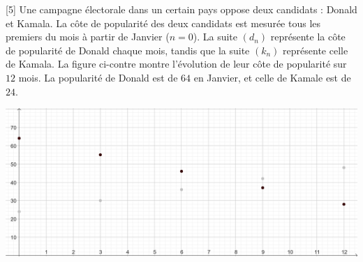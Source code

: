 \documentclass{exam}
\begin{document}
\begin{questions}
\vspace*{1cm}

[5]
Une campagne électorale dans un certain pays oppose deux candidats : Donald et Kamala. La côte de popularité des deux candidats est mesurée tous les premiers du mois à partir de Janvier ($n = 0$). La suite $(d_n)$ représente la côte de popularité de Donald chaque mois, tandis que la suite $(k_n)$ représente celle de Kamala. La figure ci-contre montre l'évolution de leur côte de popularité sur $12$ mois. La popularité de Donald est de $64$ en Janvier, et celle de Kamale est de $24$.

\begin{center}
\includegraphics[width=\textwidth]{Sondage.png}
\end{center}



\end{questions}
\end{document}
